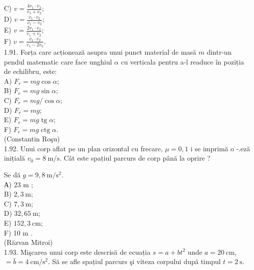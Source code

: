 \documentclass[10pt]{article}
\begin{document}
C) $v=\frac{4 v_{1} \cdot v_{2}}{v_{1}+v_{2}}$;\\
D) $v=\frac{v_{1} \cdot v_{2}}{v_{1}-v_{2}}$;\\
E) $v=\frac{2 v_{1} \cdot v_{2}}{v_{1}+v_{2}}$;\\
F) $v=\frac{v_{1} \cdot v_{2}}{v_{1}-2 v_{2}}$.\\
1.91. Forța care acționează asupra unui punct material de masă $m$ dintr-un pendul matematic care face unghiul $\alpha$ cu verticala pentru a-l readuce în poziția de echilibru, este:\\
A) $F_{r}=m g \cos \alpha$;\\
B) $F_{r}=m g \sin \alpha$;\\
C) $F_{r}=m g / \cos \alpha$;\\
D) $F_{r}=m g$;\\
E) $F_{r}=m g \operatorname{tg} \alpha$;\\
F) $F_{r}=m g \operatorname{ctg} \alpha$.\\
(Constantin Roşu)\\
1.92. Unui corp aflat pe un plan orizontal cu frecare, $\mu=0,1$ i se imprimă o -.eză inițială $v_{0}=8 \mathrm{~m} / \mathrm{s}$. Cât este spațiul parcurs de corp până la oprire ?

Se dă $g=9,8 \mathrm{~m} / \mathrm{s}^{2}$.\\
А) 23 m ;\\
B) $2,3 \mathrm{~m}$;\\
C) $7,3 \mathrm{~m}$;\\
D) $32,65 \mathrm{~m}$;\\
E) $152,3 \mathrm{~cm}$;\\
F) 10 m .\\
(Răzvan Mitroi)\\
1.93. Mişcarea unui corp este descrisă de ecuația $s=a+b t^{2}$ unde $a=20 \mathrm{~cm}$, $=\bar{b}=4 \mathrm{~cm} / \mathrm{s}^{2}$. Să se afle spațiul parcurs şi viteza corpului dupã timpul $t=2 \mathrm{~s}$.
\end{document}
